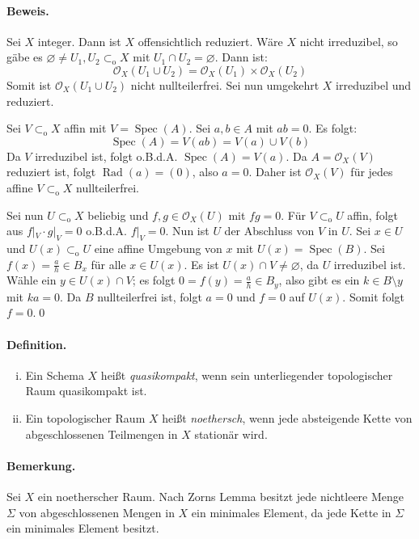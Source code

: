 \paragraph{Beweis.} Sei $X$ integer. Dann ist $X$ offensichtlich reduziert. Wäre $X$ nicht irreduzibel, so gäbe es $\varnothing\neq U_1,U_2\subset_\text{o}X$ mit $U_1\cap U_2=\varnothing$. Dann ist:
\[\mathcal{O}_X(U_1\cup U_2)=\mathcal{O}_X(U_1)\times\mathcal{O}_X(U_2) \]
Somit ist $\mathcal{O}_X(U_1\cup U_2)$ nicht nullteilerfrei. Sei nun umgekehrt $X$ irreduzibel und reduziert.

Sei $V\subset_\text{o}X$ affin mit $V=\operatorname{Spec}(A)$. Sei $a,b\in A$ mit $ab=0$. Es folgt:
\[\operatorname{Spec}(A)=V(ab)=V(a)\cup V(b) \]
Da $V$ irreduzibel ist, folgt o.B.d.A. $\operatorname{Spec}(A)=V(a)$. Da $A=\mathcal{O}_X(V)$ reduziert ist, folgt $\operatorname{Rad}(a)=(0)$, also $a=0$. Daher ist $\mathcal{O}_X(V)$ für jedes affine $V\subset_\text{o}X$ nullteilerfrei.

Sei nun $U\subset_\text{o}X$ beliebig und $f,g\in\mathcal{O}_X(U)$ mit $fg=0$. Für $V\subset_\text{o}U$ affin, folgt aus $f|_V\cdot g|_V=0$ o.B.d.A. $f|_V=0$. Nun ist $U$ der Abschluss von $V$ in $U$. Sei $x\in U$ und $U(x)\subset_\text{o}U$ eine affine Umgebung von $x$ mit $U(x)=\operatorname{Spec}(B)$. Sei $f(x)=\frac{a}{h}\in B_x$ für alle $x\in U(x)$. Es ist $U(x)\cap V\neq\varnothing$, da $U$ irreduzibel ist. Wähle ein $y\in U(x)\cap V$; es folgt $0=f(y)=\frac{a}{h}\in B_y$, also gibt es ein $k\in B\setminus y$ mit $ka=0$. Da $B$ nullteilerfrei ist, folgt $a=0$ und $f=0$ auf $U(x)$. Somit folgt $f=0$.\qed

\paragraph{Definition.} \begin{enumerate}[(i)]
\item Ein Schema $X$ heißt \textit{quasikompakt}, wenn sein unterliegender topologischer Raum quasikompakt ist.
\item Ein topologischer Raum $X$ heißt \textit{noethersch}, wenn jede absteigende Kette von abgeschlossenen Teilmengen in $X$ stationär wird.
\end{enumerate}

\paragraph{Bemerkung.} Sei $X$ ein noetherscher Raum. Nach Zorns Lemma besitzt jede nichtleere Menge $\Sigma$ von abgeschlossenen Mengen in $X$ ein minimales Element, da jede Kette in $\Sigma$ ein minimales Element besitzt.

